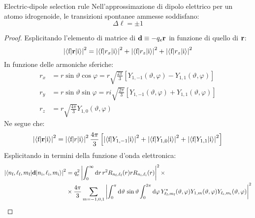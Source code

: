 \begin{theorem}{Electric-dipole selection rule}{}
	Nell'approssimazione di dipolo elettrico per un atomo idrogenoide, le transizioni spontanee ammesse soddisfano:
	\begin{equation}
		\Delta \ell = \pm 1
	\end{equation}

	\tcblower
	
	\begin{proof}
		Esplicitando l'elemento di matrice di $ \mathbf{d} \equiv -q_e \mathbf{r} $ in funzione di quello di $ \mathbf{r} $:
		\begin{equation*}
			\left\lvert\braket{\text{f} | \mathbf{r} | \text{i}}\right\rvert^2 = \left\lvert\braket{\text{f} | r_x | \text{i}}\right\rvert^2 + \left\lvert\braket{\text{f} | r_z | \text{i}}\right\rvert^2 + \left\lvert\braket{\text{f} | r_z | \text{i}}\right\rvert^2
		\end{equation*}
		In funzione delle armoniche sferiche:
		\begin{align*}
			r_x &= r \sin \vartheta \cos \varphi = r \sqrt{\frac{2\pi}{3}} \left[ Y_{1,-1}(\vartheta, \varphi) - Y_{1,1}(\vartheta, \varphi) \right] \\
			r_y &= r \sin \vartheta \sin \varphi = r i \sqrt{\frac{2\pi}{3}} \left[ Y_{1,-1}(\vartheta, \varphi) + Y_{1,1}(\vartheta, \varphi) \right] \\
			r_z &= r \sqrt{\frac{4\pi}{3}} Y_{1,0}(\vartheta, \varphi)
		\end{align*}
		Ne segue che:
		\begin{equation*}
			\left\lvert\braket{\text{f} | \mathbf{r} | \text{i}}\right\rvert^2 = \left\lvert\braket{\text{f} | r | \text{i}}\right\rvert^2 \frac{4\pi}{3} \left[ \left\lvert\braket{\text{f} | Y_{1,-1} | \text{i}}\right\rvert^2 + \left\lvert\braket{\text{f} | Y_{1,0} | \text{i}}\right\rvert^2 + \left\lvert\braket{\text{f} | Y_{1,1} | \text{i}}\right\rvert^2 \right]
		\end{equation*}
		Esplicitando in termini della funzione d'onda elettronica:
		\begin{equation*}
			\begin{split}
				\abs{\braket{n_\text{f} , \ell_\text{f} , m_\text{f} | \ve{d} | n_\text{i} , \ell_\text{i} , m_\text{i}}}^2
				& = q_e^2 \abs{\int_0^\infty \dd r\, r^2 R_{n_\text{f} , \ell_\text{f}}(r) r R_{n_\text{i} , \ell_\text{i}}(r)}^2 \times \\
				& \times \frac{4\pi}{3} \sum_{m = -1,0,1} \abs{\int_0^\pi \dd \vartheta \, \sin \vartheta \int_0^{2\pi} \dd \varphi \, Y_{\ell_\text{f} , m_\text{f}}^*(\vartheta,\varphi) Y_{1,m}(\vartheta,\varphi) Y_{\ell_\text{i} , m_\text{i}}(\vartheta,\varphi)}^2
			\end{split}

\end{equation*}
\end{proof}
\end{theorem}
